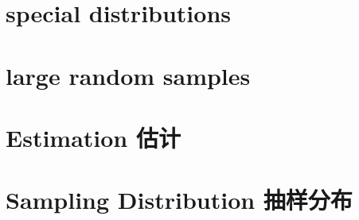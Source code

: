 \documentclass[../main.tex]{subfiles}
\begin{document}

\chapter{special distributions}
	
	
	
	
	

\chapter{large random samples}
	
	

\chapter{Estimation 估计}
	
\chapter{Sampling Distribution 抽样分布}
	
	
\end{document}
